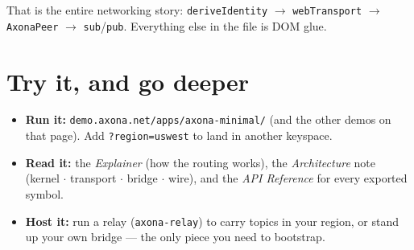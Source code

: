 \documentclass[nobib]{tufte-handout}
\begin{document}
That is the entire networking story: \texttt{deriveIdentity} $\rightarrow$
\texttt{webTransport} $\rightarrow$ \texttt{AxonaPeer} $\rightarrow$
\texttt{sub}/\texttt{pub}. Everything else in the file is DOM glue.

\section{Try it, and go deeper}

\begin{itemize}
\item \textbf{Run it:} \texttt{demo.axona.net/apps/axona-minimal/} (and the other
demos on that page). Add \texttt{?region=uswest} to land in another keyspace.
\item \textbf{Read it:} the \emph{Explainer} (how the routing works), the
\emph{Architecture} note (kernel $\cdot$ transport $\cdot$ bridge $\cdot$ wire),
and the \emph{API Reference} for every exported symbol.
\item \textbf{Host it:} run a relay (\texttt{axona-relay}) to carry topics in your
region, or stand up your own bridge --- the only piece you need to bootstrap.
\end{itemize}

\vspace{0.3em}
\end{document}
